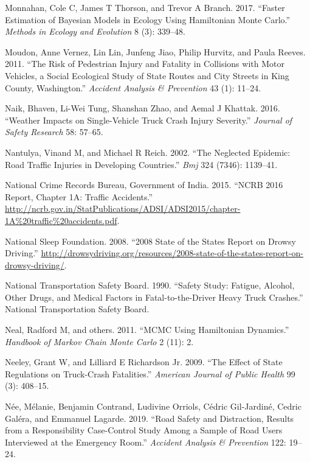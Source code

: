 \documentclass[12pt]{book}
\numberwithin{equation}{chapter}
\begin{document}
\leavevmode\hypertarget{ref-monnahan2017faster}{}%
Monnahan, Cole C, James T Thorson, and Trevor A Branch. 2017. ``Faster Estimation of Bayesian Models in Ecology Using Hamiltonian Monte Carlo.'' \emph{Methods in Ecology and Evolution} 8 (3): 339--48.

\leavevmode\hypertarget{ref-moudon2011risk}{}%
Moudon, Anne Vernez, Lin Lin, Junfeng Jiao, Philip Hurvitz, and Paula Reeves. 2011. ``The Risk of Pedestrian Injury and Fatality in Collisions with Motor Vehicles, a Social Ecological Study of State Routes and City Streets in King County, Washington.'' \emph{Accident Analysis \& Prevention} 43 (1): 11--24.

\leavevmode\hypertarget{ref-naik2016weather}{}%
Naik, Bhaven, Li-Wei Tung, Shanshan Zhao, and Aemal J Khattak. 2016. ``Weather Impacts on Single-Vehicle Truck Crash Injury Severity.'' \emph{Journal of Safety Research} 58: 57--65.

\leavevmode\hypertarget{ref-nantulya2002neglected}{}%
Nantulya, Vinand M, and Michael R Reich. 2002. ``The Neglected Epidemic: Road Traffic Injuries in Developing Countries.'' \emph{Bmj} 324 (7346): 1139--41.

\leavevmode\hypertarget{ref-india2015}{}%
National Crime Records Bureau, Government of India. 2015. ``NCRB 2016 Report, Chapter 1A: Traffic Accidents.'' \url{http://ncrb.gov.in/StatPublications/ADSI/ADSI2015/chapter-1A\%20traffic\%20accidents.pdf}.

\leavevmode\hypertarget{ref-nsleepf}{}%
National Sleep Foundation. 2008. ``2008 State of the States Report on Drowsy Driving.'' \url{http://drowsydriving.org/resources/2008-state-of-the-states-report-on-drowsy-driving/}.

\leavevmode\hypertarget{ref-ntsb1990}{}%
National Transportation Safety Board. 1990. ``Safety Study: Fatigue, Alcohol, Other Drugs, and Medical Factors in Fatal-to-the-Driver Heavy Truck Crashes.'' National Transportation Safety Board.

\leavevmode\hypertarget{ref-neal2011mcmc}{}%
Neal, Radford M, and others. 2011. ``MCMC Using Hamiltonian Dynamics.'' \emph{Handbook of Markov Chain Monte Carlo} 2 (11): 2.

\leavevmode\hypertarget{ref-neeley2009effect}{}%
Neeley, Grant W, and Lilliard E Richardson Jr. 2009. ``The Effect of State Regulations on Truck-Crash Fatalities.'' \emph{American Journal of Public Health} 99 (3): 408--15.

\leavevmode\hypertarget{ref-nee2019road}{}%
Née, Mélanie, Benjamin Contrand, Ludivine Orriols, Cédric Gil-Jardiné, Cedric Galéra, and Emmanuel Lagarde. 2019. ``Road Safety and Distraction, Results from a Responsibility Case-Control Study Among a Sample of Road Users Interviewed at the Emergency Room.'' \emph{Accident Analysis \& Prevention} 122: 19--24.
\end{document}
